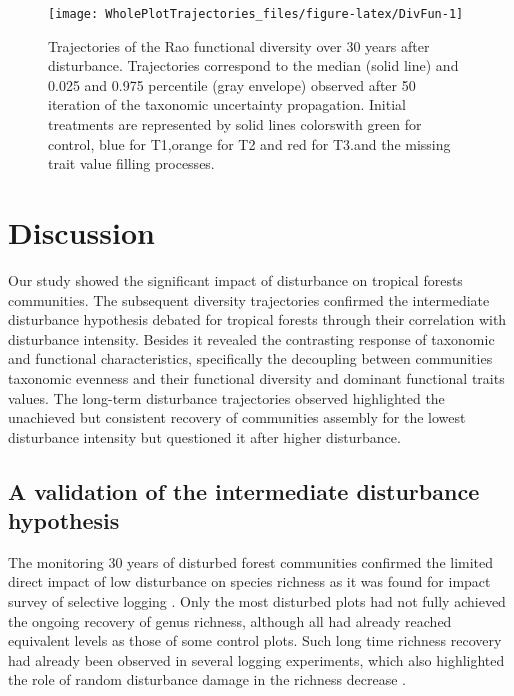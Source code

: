 \documentclass[fleqn,10pt]{ArtEcoFoG} %
\theoremstyle{definition}
\theoremstyle{definition}
\theoremstyle{definition}
\theoremstyle{remark}
\begin{document}
\begin{figure}

{\centering \texttt{[image: WholePlotTrajectories\_files/figure-latex/DivFun-1]} 

}

\caption{Trajectories of the Rao functional diversity over 30 years after disturbance. Trajectories correspond to the median (solid line) and 0.025 and 0.975 percentile (gray envelope) observed after 50 iteration of the taxonomic uncertainty propagation. Initial treatments are represented by solid lines colorswith green for control, blue for T1,orange for T2 and red for T3.and the missing trait value filling processes.}\label{fig:DivFun}
\end{figure}

\section{Discussion}\label{discussion}

Our study showed the significant impact of disturbance on tropical
forests communities. The subsequent diversity trajectories confirmed the
intermediate disturbance hypothesis debated for tropical forests through
their correlation with disturbance intensity. Besides it revealed the
contrasting response of taxonomic and functional characteristics,
specifically the decoupling between communities taxonomic evenness and
their functional diversity and dominant functional traits values. The
long-term disturbance trajectories observed highlighted the unachieved
but consistent recovery of communities assembly for the lowest
disturbance intensity but questioned it after higher disturbance.

\subsection{A validation of the intermediate disturbance
hypothesis}\label{a-validation-of-the-intermediate-disturbance-hypothesis}

The monitoring 30 years of disturbed forest communities confirmed the
limited direct impact of low disturbance on species richness as it was
found for impact survey of selective logging
\citep{Cannon1998, Baraloto2012a}. Only the most disturbed plots had not
fully achieved the ongoing recovery of genus richness, although all had
already reached equivalent levels as those of some control plots. Such
long time richness recovery had already been observed in several logging
experiments, which also highlighted the role of random disturbance
damage in the richness decrease \citep{deAvila2015, Hu2018}.
\end{document}
